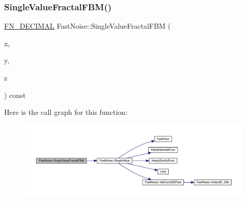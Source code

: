 \subsubsection{\texorpdfstring{Single\+Value\+Fractal\+F\+B\+M()}{SingleValueFractalFBM()}\hspace{0.1cm}{\footnotesize\ttfamily [2/2]}}
{\footnotesize\ttfamily \mbox{\hyperlink{_fast_noise_8h_a75a9ef6d2541c4921815b885bfd449c3}{F\+N\+\_\+\+D\+E\+C\+I\+M\+AL}} Fast\+Noise\+::\+Single\+Value\+Fractal\+F\+BM (\begin{DoxyParamCaption}\item[{\mbox{\hyperlink{_fast_noise_8h_a75a9ef6d2541c4921815b885bfd449c3}{F\+N\+\_\+\+D\+E\+C\+I\+M\+AL}}}]{x,  }\item[{\mbox{\hyperlink{_fast_noise_8h_a75a9ef6d2541c4921815b885bfd449c3}{F\+N\+\_\+\+D\+E\+C\+I\+M\+AL}}}]{y,  }\item[{\mbox{\hyperlink{_fast_noise_8h_a75a9ef6d2541c4921815b885bfd449c3}{F\+N\+\_\+\+D\+E\+C\+I\+M\+AL}}}]{z }\end{DoxyParamCaption}) const\hspace{0.3cm}{\ttfamily [private]}}

Here is the call graph for this function\+:
\nopagebreak
\begin{figure}[H]
\begin{center}
\leavevmode
\includegraphics[width=350pt]{d1/dd8/class_fast_noise_a9189fa5c0fa9d9871290ade57dabe022_cgraph}
\end{center}
\end{figure}
\mbox{\label{class_fast_noise_a9061e8fb70914a8aa976d861d21a4f63}} 
